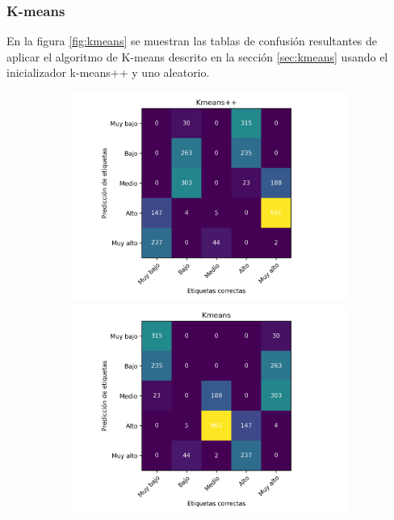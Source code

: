 \subsubsection{K-means}

En la figura \ref{fig:kmeans} se muestran las tablas de confusión resultantes de aplicar el algoritmo de K-means descrito en la sección \ref{sec:kmeans} usando el inicializador k-means++ y uno aleatorio.

\begin{figure}[H]
    \centering
    \begin{subfigure}{8.4cm}
        \includegraphics[width=1\linewidth]{Graphics/Data_2015/Kmeans++_confusion_matrix.png}
        \includegraphics[width=1\linewidth]{Graphics/Data_2015/Kmeans_random_confusion_matrix.png}

\end{subfigure}
\end{figure}
